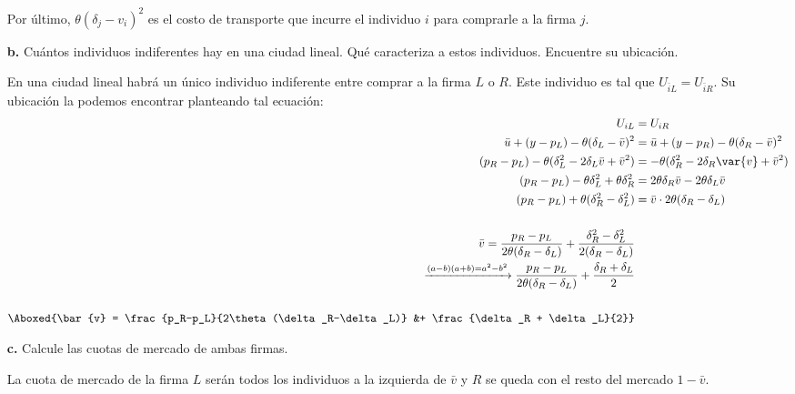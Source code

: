 \documentclass{exam}
\begin{document}
\begin{enumerate}
\begin{solution}
        Por último, $\theta(\delta_j - v_i)^2$ es el costo de transporte que incurre el individuo $i$ para comprarle a la firma $j$. 
    \end{solution}
    \item[\textbf{b.}] Cuántos individuos indiferentes hay en una ciudad lineal. Qué caracteriza a estos individuos. Encuentre su ubicación. 
    \begin{solution}
        En una ciudad lineal habrá un único individuo indiferente entre comprar a la firma $L$ o $R$. Este individuo es tal que $U_{\bar{i}L} = U_{\bar{i}R}$. Su ubicación la podemos encontrar planteando tal ecuación:
        \begin{align*}
    U_{iL} &= U_{iR} \\ 
    \bar{u} + (y-p_L) - \theta (\delta_L - \bar{v})^2 &= \bar{u} + (y-p_R) - \theta (\delta_R - \bar{v})^2 \\
    (p_R - p_L) - \theta (\delta _L ^2 - 2\delta_L \bar{v} + \bar{v}^2) &= - \theta (\delta_R^2-2\delta_R \var{v} + \bar{v}^2 ) \\
    (p_R - p_L) - \theta \delta_L^2 + \theta \delta_R^2 &= 2\theta \delta _R\bar{v} - 2\theta \delta_L \bar{v}  \\
    (p_R - p_L) + \theta (\delta_R^2 - \delta_L^2 ) &= \bar{v} \cdot 2\theta (\delta _R - \delta_L) \\
    \quad \\
    \bar{v} = \frac{p_R-p_L}{2\theta (\delta_R-\delta_L)} + \frac{\delta_R^2 -\delta _L^2}{2(\delta_R-\delta_L)} \\
    \xrightarrow{(a-b)(a+b)= a^2 - b^2} \frac{p_R-p_L}{2\theta (\delta_R-\delta_L)} + \frac{\delta_R + \delta_L}{2} \\ \quad \\
    \Aboxed{\bar{v} = \frac{p_R-p_L}{2\theta (\delta_R-\delta_L)} &+ \frac{\delta_R + \delta_L}{2}}
    \end{align*}
    \end{solution}
    \item[\textbf{c.}] Calcule las cuotas de mercado de ambas firmas. 
    \begin{solution}
        La cuota de mercado de la firma $L$ serán todos los individuos a la izquierda de $\bar{v}$ y $R$ se queda con el resto del mercado $1-\bar{v}$.


\end{solution}
\end{enumerate}
\end{document}
